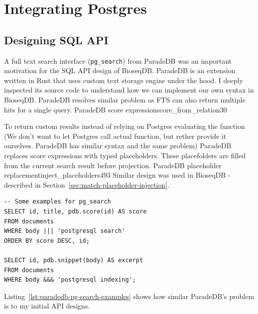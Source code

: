 \section{Integrating Postgres}
\label{sec:mmsearch-sql-rendezvous}


\subsection{Designing SQL API}

A full text search interface (\texttt{pg\_search}) from ParadeDB was an important motivation for the SQL API design of BioseqDB. 
ParadeDB is an extension written in Rust that uses custom text storage engine under the hood. I deeply inspected its source code to understand how we can implement our own syntax in BioseqDB.
ParadeDB resolves similar problem as FTS can also return multiple hits for a single query.
{ParadeDB score expression}{score_from_relation}{30}

To return custom results instead of relying on Postgres evaluating the function (We don't want to let Postgres call actual  function, but rether provide it ourselves. ParadeDB has similar syntax and the same problem)
 ParadeDB replaces score expressions with typed placeholders.
These placefolders are filled from the current search result before projection.
  {ParadeDB placeholder replacement}{inject_placeholders}{493}
Similar design was used in BioseqDB - described in Section~\ref{sec:match-placeholder-injection}.

\noindent\begin{minipage}{\linewidth}
\begin{lstlisting}[style=bioseq-search-sql,caption={ParadeDB pg\_search examples},label={lst:paradedb-pg-search-examples}]
-- Some examples for pg_search
SELECT id, title, pdb.score(id) AS score
FROM documents
WHERE body ||| 'postgresql search'
ORDER BY score DESC, id;

SELECT id, pdb.snippet(body) AS excerpt
FROM documents
WHERE body &&& 'postgresql indexing';
\end{lstlisting}
\end{minipage}

Listing~\ref{lst:paradedb-pg-search-examples} shows how similar ParadeDB's problem is to my initial API designs.\autocite{pigsty_pg_search}\autocite{neon_pg_search}

